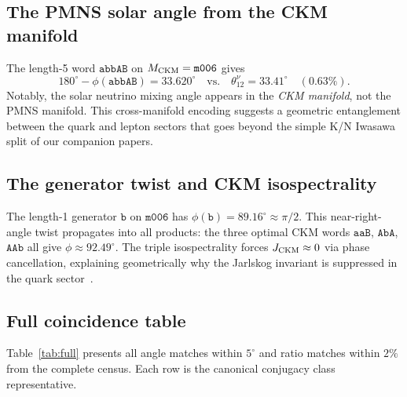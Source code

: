 ﻿\documentclass[aps,prd,twocolumn,longbibliography]{revtex4-2}
\newcommand{\mfld}[1]{\texttt{#1}}
\newcommand{\word}[1]{\texttt{#1}}
\newcommand{\degr}{^{\circ}}
\begin{document}
\subsection{The PMNS solar angle from the CKM manifold}
\label{sec:theta12nu}

The length-5 word $\word{abbAB}$ on $M_{\rm CKM}=\mfld{m006}$ gives
\begin{equation}
  180\degr - \phi(\word{abbAB}) = 33.620\degr
  \quad\text{vs.}\quad \theta_{12}^\nu=33.41\degr \quad (0.63\%).
\end{equation}
Notably, the solar neutrino mixing angle appears in the \emph{CKM manifold},
not the PMNS manifold.
This cross-manifold encoding suggests a geometric entanglement between the
quark and lepton sectors that goes beyond the simple K/N Iwasawa split
of our companion papers.

\subsection{The generator twist and CKM isospectrality}
\label{sec:generator}

The length-1 generator $\word{b}$ on $\mfld{m006}$ has
$\phi(\word{b})=89.16\degr\approx\pi/2$.
This near-right-angle twist propagates into all products: the three optimal
CKM words $\word{aaB}$, $\word{AbA}$, $\word{AAb}$ all give
$\phi\approx 92.49\degr$.
The triple isospectrality forces $J_{\rm CKM}\approx 0$ via phase cancellation,
explaining geometrically why the Jarlskog invariant is suppressed in the
quark sector~\cite{GentryCKM}.

\subsection{Full coincidence table}
\label{sec:full_table}

Table~\ref{tab:full} presents all angle matches within $5\degr$ and ratio
matches within $2\%$ from the complete census.
Each row is the canonical conjugacy class representative.
\end{document}

